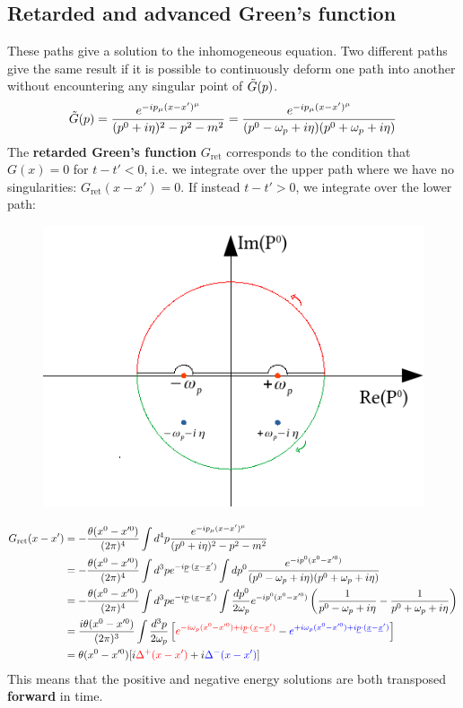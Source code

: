 \documentclass[../main.tex]{subfiles}
\begin{document}
\subsection{Retarded and advanced Green's function}
These paths give a solution to the inhomogeneous equation. Two different paths give the same result if it is possible to continuously deform one path into another without encountering any singular point of $\Tilde{G}(p)$.
\[
\Tilde{G}(p)=\frac{e^{-ip_\mu(x-x')^\mu}}{(p^0+i\eta)^2-p^2-m^2}=\frac{e^{-ip_\mu(x-x')^\mu}}{(p^0-\omega_p+i\eta)(p^0+\omega_p+i\eta)}
\]
The \textbf{retarded Green's function} $G_{\text{ret}}$ corresponds to the condition that $G(x)=0$ for $t-t'<0$, i.e. we integrate over the upper path where we have no singularities: $G_{\text{ret}}(x-x')=0$. If instead $t-t'>0$, we integrate over the lower path:
\begin{figure}[h!]
    \includegraphics{Images/Greenfunction.pdf}
    \caption*{}
\end{figure}
\begin{align*}
G_{\text{ret}}(x-x')&=-\frac{\theta(x^0-x'^0)}{(2\pi)^4}\int d^4p\frac{e^{-ip_\mu(x-x')^\mu}}{(p^0+i\eta)^2-p^2-m^2}\\
&=-\frac{\theta(x^0-x'^0)}{(2\pi)^4}\int d^3pe^{-i\underline{p}\cdot(\underline{x}-\underline{x}')}\int dp^0\frac{e^{-ip^0(x^0-x'^0)}}{(p^0-\omega_p+i\eta)(p^0+\omega_p+i\eta)}\\
&=-\frac{\theta(x^0-x'^0)}{(2\pi)^4}\int d^3pe^{-i\underline{p}\cdot(\underline{x}-\underline{x}')}\int \frac{dp^0}{2\omega_p}e^{-ip^0(x^0-x'^0)}\left(\frac{1}{p^0-\omega_p+i\eta}-\frac{1}{p^0+\omega_p+i\eta}\right)\\
&=\frac{i\theta(x^0-x'^0)}{(2\pi)^3}\int\frac{d^3p}{2\omega_p}\left[{\color{red}e^{-i\omega_p(x^0-x'^0)+i\underline{p}\cdot(\underline{x}-\underline{x}')}}-{\color{blue}e^{+i\omega_p(x^0-x'^0)+i\underline{p}\cdot(\underline{x}-\underline{x}')}}\right]\\
&=\theta(x^0-x'^0)[i{\color{red}\Delta^+(x-x')}+i{\color{blue}\Delta^-(x-x')}]
\end{align*}
This means that the positive and negative energy solutions are both transposed \textbf{forward} in time.
\end{document}
